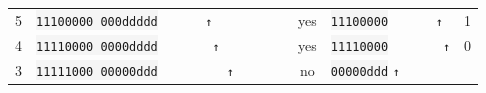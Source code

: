 \begin{longtable}[]{@{}ccccc@{}}
\begin{minipage}[t]{0.13\columnwidth}\centering\strut
5\strut
\end{minipage} & \begin{minipage}[t]{0.26\columnwidth}\centering\strut
\colorbox{WhiteSmoke}{\lstinline!11100000 000ddddd!} \small\verb!      ↑          !\strut
\end{minipage} & \begin{minipage}[t]{0.18\columnwidth}\centering\strut
yes\strut
\end{minipage} & \begin{minipage}[t]{0.14\columnwidth}\centering\strut
\colorbox{WhiteSmoke}{\lstinline!11100000!} \small\verb!      ↑ !\strut
\end{minipage} & \begin{minipage}[t]{0.14\columnwidth}\centering\strut
1\strut
\end{minipage}\tabularnewline
\begin{minipage}[t]{0.13\columnwidth}\centering\strut
4\strut
\end{minipage} & \begin{minipage}[t]{0.26\columnwidth}\centering\strut
\colorbox{WhiteSmoke}{\lstinline!11110000 0000dddd!} \small\verb!       ↑         !\strut
\end{minipage} & \begin{minipage}[t]{0.18\columnwidth}\centering\strut
yes\strut
\end{minipage} & \begin{minipage}[t]{0.14\columnwidth}\centering\strut
\colorbox{WhiteSmoke}{\lstinline!11110000!} \small\verb!       ↑!\strut
\end{minipage} & \begin{minipage}[t]{0.14\columnwidth}\centering\strut
0\strut
\end{minipage}\tabularnewline
\begin{minipage}[t]{0.13\columnwidth}\centering\strut
3\strut
\end{minipage} & \begin{minipage}[t]{0.26\columnwidth}\centering\strut
\colorbox{WhiteSmoke}{\lstinline!11111000 00000ddd!} \small\verb!         ↑       !\strut
\end{minipage} & \begin{minipage}[t]{0.18\columnwidth}\centering\strut
no\strut
\end{minipage} & \begin{minipage}[t]{0.14\columnwidth}\centering\strut
\colorbox{WhiteSmoke}{\lstinline!00000ddd!} \small\verb!↑       !\strut

\end{minipage}
\end{longtable}
